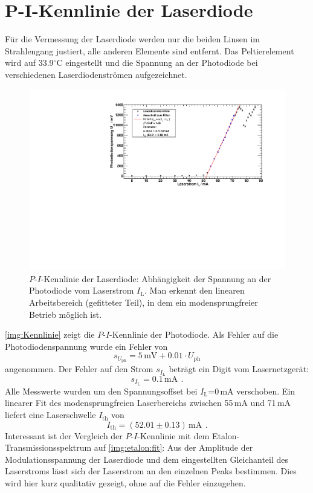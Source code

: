\section{P-I-Kennlinie der Laserdiode}
\label{sect:durchführung}
Für die Vermessung der Laserdiode werden nur die beiden Linsen im Strahlengang justiert,
alle anderen Elemente sind entfernt.
Das Peltierelement wird auf 33.9$^\circ$C eingestellt und die Spannung an der
Photodiode bei verschiedenen Laserdiodenströmen aufgezeichnet.
\begin{figure}[H]
    \begin{center}
        \includegraphics[width=\textwidth]{../img/part1/diodenkennlinie.pdf}
        \caption{$P$-$I$-Kennlinie der Laserdiode: Abhängigkeit der Spannung
        an der Photodiode vom Laserstrom $I_\text{L}$. Man erkennt den linearen Arbeitsbereich (gefitteter Teil),
        in dem ein modensprungfreier Betrieb möglich ist.}
        \label{img:Kennlinie}
    \end{center}
\end{figure}
\autoref{img:Kennlinie} zeigt die $P$-$I$-Kennlinie der Photodiode.
Als Fehler auf die Photodiodenspannung wurde ein Fehler von
\begin{equation}
    s_{U_{\text{ph}}}= 5\,\text{mV} + 0.01 \cdot U_{\text{ph}}
\end{equation}
angenommen.
Der Fehler auf den Strom $s_{I_{\text{L}}}$ beträgt ein Digit vom Lasernetzgerät:
\begin{equation}
    s_{I_{\text{L}}} = 0.1\,\text{mA} \ \, .
\end{equation}
Alle Messwerte wurden um den Spannungsoffset bei $I_{\text{L}}$=0\,mA verschoben.
Ein linearer Fit des modensprungfreien Laserbereichs zwischen 55\,mA und 71\,mA
liefert eine Laserschwelle $I_{\text{th}}$ von
\begin{equation}
    I_{\text{th}}=(52.01 \pm 0.13)\,\text{mA} \ \, .
\end{equation}
Interessant ist der Vergleich der $P$-$I$-Kennlinie mit dem Etalon-Transmissionsspektrum auf \autoref{img:etalon:fit}:
Aus der Amplitude der Modulationsspannung der Laserdiode und dem eingestellten Gleichanteil des Laserstroms
lässt sich der Laserstrom an den einzelnen Peaks bestimmen.
Dies wird hier kurz qualitativ gezeigt, ohne auf die Fehler einzugehen.

